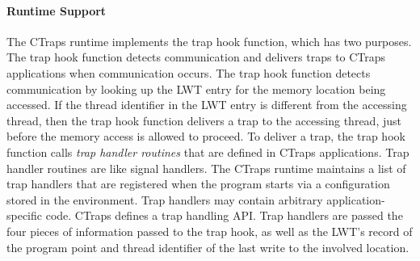 \documentclass[preprint,9pt]{sigplanconf}
\newcommand{\ctraps}{CTraps\xspace}
\newcommand{\lwt}{LWT\xspace}
\begin{document}
\paragraph{Runtime Support}
The \ctraps runtime implements the trap hook function,  which has two purposes.
The trap hook function detects communication and delivers traps to \ctraps
applications when communication occurs.  The trap hook function detects
communication by looking up the \lwt entry for the memory location being
accessed.  If the thread identifier in the \lwt entry is different from the
accessing thread, then the trap hook function delivers a trap to the accessing
thread, just before the memory access is allowed to proceed.  To deliver a
trap, the trap hook function calls {\em trap handler routines} that are defined
in \ctraps applications.  Trap handler routines are like signal handlers.  The
\ctraps runtime maintains a list of trap handlers that are registered when the
program starts via a configuration stored in the environment.  Trap handlers
may contain arbitrary application-specific code.  \ctraps defines a trap
handling API.  Trap handlers are passed the four pieces of information passed
to the trap hook, as well as the \lwt's record of the program point and thread
identifier of the last write to the involved location.

\end{document}
